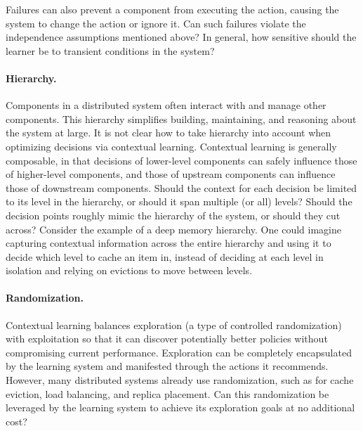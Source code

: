 \documentclass[letterpaper,twocolumn]{article}
\newcommand{\ignore}[1]{}
\begin{document}
Failures can also prevent a component from executing the action, causing the
system to change the action or ignore it.  Can such failures violate the
independence assumptions mentioned above?  In general, how sensitive should
the learner be to transient conditions in the system?

\paragraph{Hierarchy.}
Components in a distributed system often interact with and manage other
components. This hierarchy simplifies building, maintaining, and reasoning
about the system at large. It is not clear how to take hierarchy into
account when optimizing decisions via contextual learning.  Contextual learning
is generally composable, in that decisions of lower-level
components can safely influence those of higher-level components, and those of
upstream components can influence those of downstream components.   Should the
context for each decision be limited to its level in the hierarchy, or should it span
multiple (or all) levels?  Should the decision points roughly mimic the
hierarchy of the system, or should they cut across? Consider the example of a
deep memory hierarchy. One could imagine capturing contextual
information across the entire hierarchy and using it to decide which level to cache an item in, instead of deciding at each level in isolation and relying on evictions to move between levels.

\paragraph*{Randomization.}

Contextual learning balances exploration (a type of controlled randomization)
with exploitation so that it can discover potentially better policies
without compromising current performance.  Exploration can be completely
encapsulated by the learning system and manifested through the actions it
recommends.  However, many distributed systems already use
randomization, such as for cache eviction, load balancing, 
and replica placement.  Can this randomization be leveraged by the learning
system to achieve its exploration goals at no additional cost?

\ignore{First, if multiple components are making decisions independently, it is
important to ensure that the randomization used by each (e.g. the seed passed to
the learning system) are independent of each other.}
\end{document}
